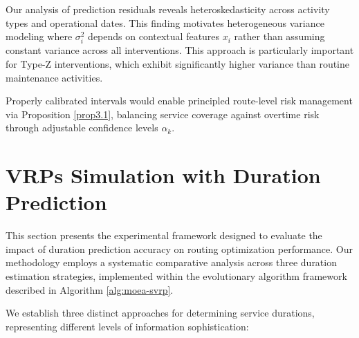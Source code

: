 \documentclass[preprint,12pt]{elsarticle}
\begin{document}
 Our analysis of prediction residuals reveals heteroskedasticity across activity types and operational dates. This finding motivates heterogeneous variance modeling where $\sigma_i^2$ depends on contextual features $x_i$ rather than assuming constant variance across all interventions. This approach is particularly important for Type-Z interventions, which exhibit significantly higher variance than routine maintenance activities.
 
 Properly calibrated intervals would enable principled route-level risk management via Proposition \ref{prop3.1}, balancing service coverage against overtime risk through adjustable confidence levels $\alpha_k$.

\section{VRPs Simulation with Duration Prediction}
\label{sec:vrp}



This section presents the experimental framework designed to evaluate the impact of duration prediction accuracy on routing optimization performance.
  Our methodology employs a systematic comparative analysis across three duration estimation strategies, implemented within the evolutionary algorithm
  framework described in Algorithm \ref{alg:moea-svrp}.

 

  We establish three distinct approaches for determining service durations, representing different levels of information sophistication:
\end{document}
